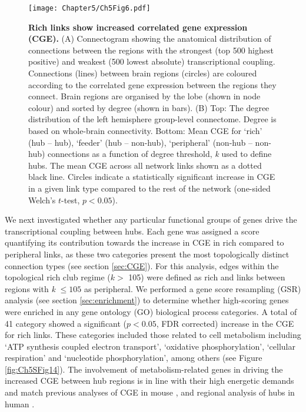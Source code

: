 \begin{figure}[h!]
\begin{center}
\texttt{[image: Chapter5/Ch5Fig6.pdf]}%
\end{center}
\caption{\textbf{Rich links show increased correlated gene expression (CGE).}
(A) Connectogram showing the anatomical distribution of connections between the regions with the strongest (top 500 highest positive) and weakest (500 lowest absolute) transcriptional coupling. Connections (lines) between brain regions (circles) are coloured according to the correlated gene expression between the regions they connect. Brain regions are organised by the lobe (shown in node colour) and sorted by degree (shown in bars). 
(B) Top: The degree distribution of the left hemisphere group-level connectome. Degree is based on whole-brain connectivity. Bottom: Mean CGE for `rich' (hub -- hub), `feeder' (hub -- non-hub), `peripheral' (non-hub -- non-hub) connections as a function of degree threshold, \textit{k} used to define hubs. The mean CGE across all network links shown as a dotted black line. Circles indicate a statistically significant increase in CGE in a given link type compared to the rest of the network (one-sided Welch's $t$-test, $p < 0.05$).}
\label{fig:Ch5Fig6}
\end{figure}

We next investigated whether any particular functional groups of genes drive the transcriptional coupling between hubs. Each gene was assigned a score quantifying its contribution towards the increase in CGE in rich compared to peripheral links, as these two categories present the most topologically distinct connection types (see section \ref{sec:CGE}). For this analysis, edges within the topological rich club regime ($k >$ 105) were defined as rich and links between regions with \textit{k} $\leq105$ as peripheral. We performed a gene score resampling (GSR) analysis (see section \ref{sec:enrichment}) to determine whether high-scoring genes were enriched in any gene ontology (GO) biological process categories. A total of 41 category showed a significant ($p<0.05$, FDR corrected) increase in the CGE for rich links. These categories included those related to cell metabolism including `ATP synthesis coupled electron transport', `oxidative phosphorylation', `cellular respiration' and `nucleotide phosphorylation', among others (see Figure \ref{fig:Ch5SFig14}). The involvement of metabolism-related genes in driving the increased CGE between hub regions is in line with their high energetic demands \citep{Bullmore2012,Collin2014,Liang2013a,Tomasi2013} and match previous analyses of CGE in mouse \citep{Fulcher2016}, and regional analysis of hubs in human \citep{Vertes2016b}.

